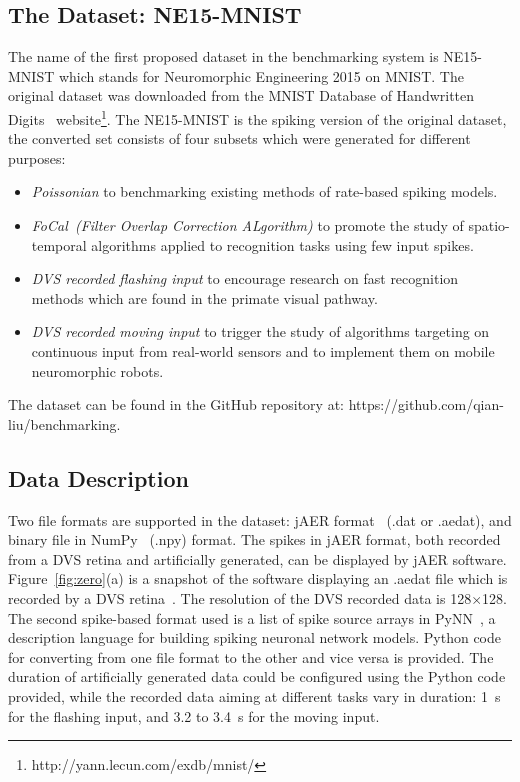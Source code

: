 \documentclass{frontiersENG} %
\begin{document}
\subsection{The Dataset: NE15-MNIST}
\label{sec:data}
The name of the first proposed dataset in the benchmarking system is NE15-MNIST which stands for Neuromorphic Engineering 2015 on MNIST.
The original dataset was downloaded from the MNIST Database of Handwritten Digits~\citep{lecun1998gradient}  website\footnote{http://yann.lecun.com/exdb/mnist/}.
The NE15-MNIST is the spiking version of the original dataset, the converted set consists of four subsets which were generated for different purposes:
\begin{itemize}
	\item \textit{Poissonian}
	to benchmarking existing methods of rate-based spiking models.
	\item \textit{FoCal~(Filter Overlap Correction ALgorithm)}
	to promote the study of spatio-temporal algorithms applied to recognition tasks using few input spikes.
	\item \textit{DVS recorded flashing input}
	to encourage research on fast recognition methods which are found in the primate visual pathway.
	\item \textit{DVS recorded moving input}
	to trigger the study of algorithms targeting on continuous input from real-world sensors and to implement them on mobile neuromorphic robots.
\end{itemize}
The dataset can be found in the GitHub repository at: https://github.com/qian-liu/benchmarking.
\subsection{Data Description}

Two file formats are supported in the dataset: jAER format~\citep{delbruck2008frame} (.dat or .aedat), and binary file in NumPy~\citep{numpyPython} (.npy) format.
The spikes in jAER format, both recorded from a DVS retina and artificially generated, can be displayed by jAER software.
Figure~\ref{fig:zero}(a) is a snapshot of the software displaying an .aedat file which is recorded by a DVS retina~\citep{serrano2013128}.
The resolution of the DVS recorded data is 128$\times$128.
The second spike-based format used is a list of spike source arrays in PyNN~\citep{davison2008pynn}, a description language for building spiking neuronal network models.
Python code for converting from one file format to the other and vice versa is provided.
The duration of artificially generated data could be configured using the Python code provided, while the recorded data aiming at different tasks vary in duration: 1~s for the flashing input, and 3.2 to 3.4~s for the moving input.
\end{document}
